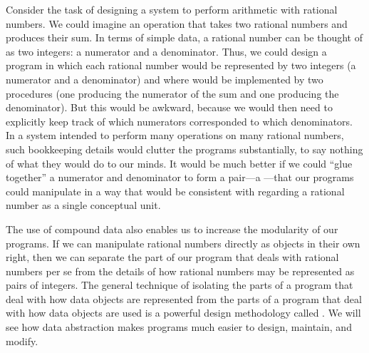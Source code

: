 Consider the task of designing a system to perform arithmetic with rational numbers.
We could imagine an operation  that takes two rational numbers and produces their sum.
In terms of simple data, a rational number can be thought of as two integers:
a numerator and a denominator.
Thus, we could design a program in which each rational number would be represented by two integers (a numerator and a denominator) and where  would be implemented by two procedures (one producing the numerator of the sum and one producing the denominator).
But this would be awkward, because we would then need to explicitly keep track of which numerators corresponded to which denominators.
In a system intended to perform many operations on many rational numbers, such bookkeeping details would clutter the programs substantially, to say nothing of what they would do to our minds.
It would be much better if we could “glue together” a numerator and denominator to form a pair---a ---that our programs could manipulate in a way that would be consistent with regarding a rational number as a single conceptual unit.

The use of compound data also enables us to increase the modularity of our programs.
If we can manipulate rational numbers directly as objects in their own right, then we can separate the part of our program that deals with rational numbers per se from the details of how rational numbers may be represented as pairs of integers.
The general technique of isolating the parts of a program that deal with how data objects are represented from the parts of a program that deal with how data objects are used is a powerful design methodology called .
We will see how data abstraction makes programs much easier to design, maintain, and modify.

